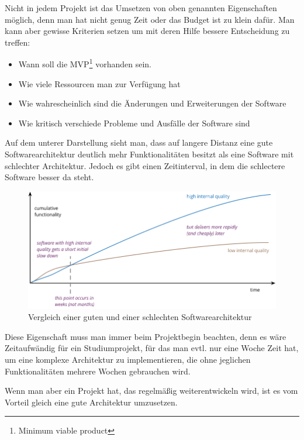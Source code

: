 \documentclass{article}
\begin{document}
    Nicht in jedem Projekt ist das Umsetzen von oben genannten Eigenschaften möglich, 
    denn man hat nicht genug Zeit oder das Budget ist zu klein dafür.
    Man kann aber gewisse Kriterien setzen um mit deren Hilfe bessere Entscheidung zu treffen:
    \begin{itemize}
        \item Wann soll die MVP\footnote[1]{Minimum viable product} vorhanden sein.
        \item Wie viele Ressourcen man zur Verfügung hat
        \item Wie wahrescheinlich sind die Änderungen und Erweiterungen der Software
        \item Wie kritisch verschiede Probleme und Ausfälle der Software sind 
    \end{itemize}

    Auf dem unterer Darstellung sieht man, dass auf langere Distanz eine gute Softwarearchitektur deutlich
    mehr Funktionalitäten besitzt als eine Software mit schlechter Architektur. 
    Jedoch es gibt einen Zeitinterval, in dem die schlectere Software besser da steht.
    \begin{figure}[H]
        \centering
        \includegraphics[width=1\textwidth]{./images/QASoftwareCompare.png}
        \caption[Vergleich einer guten und einer schlechten Softwarearchitektur]{Vergleich einer guten und einer schlechten Softwarearchitektur \footnotemark}
        \label{fig:softQuality}
    \end{figure}
    Diese Eigenschaft muss man immer beim Projektbegin beachten, denn es wäre Zeitaufwändig für ein Studiumprojekt, 
    für das man evtl. nur eine Woche Zeit hat, um eine komplexe Architektur zu implementieren, die ohne jeglichen Funktionalitäten mehrere Wochen gebrauchen wird.

    Wenn man aber ein Projekt hat, das regelmäßig weiterentwickeln wird, ist es vom Vorteil gleich eine gute Architektur umzusetzen.
\end{document}

